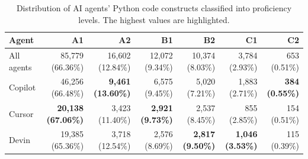 \begin{table}[t]
\centering
\caption{Distribution of AI agents' Python code constructs classified into proficiency levels. The highest values are highlighted.}
\label{tab:rq1-levels}
\begin{tabular}{lrrrrrr}
\toprule
Agent & A1 & A2 & B1 & B2 & C1 & C2 \\
\midrule
All agents & 85,779 (66.36\%) & 16,602 (12.84\%) & 12,072 (9.34\%) & 10,374 (8.03\%) & 3,784 (2.93\%) & 653 (0.51\%) \\
\midrule
Copilot & 46,256 (66.48\%) & \textbf{9,461 (13.60\%)} & 6,575 (9.45\%) & 5,020 (7.21\%) & 1,883 (2.71\%) & \textbf{384 (0.55\%)} \\
Cursor & \textbf{20,138 (67.06\%)} & 3,423 (11.40\%) & \textbf{2,921 (9.73\%)} & 2,537 (8.45\%) & 855 (2.85\%) & 154 (0.51\%) \\
Devin & 19,385 (65.36\%) & 3,718 (12.54\%) & 2,576 (8.69\%) & \textbf{2,817 (9.50\%)} & \textbf{1,046 (3.53\%)} & 115 (0.39\%) \\
\bottomrule
\end{tabular}
\end{table}
